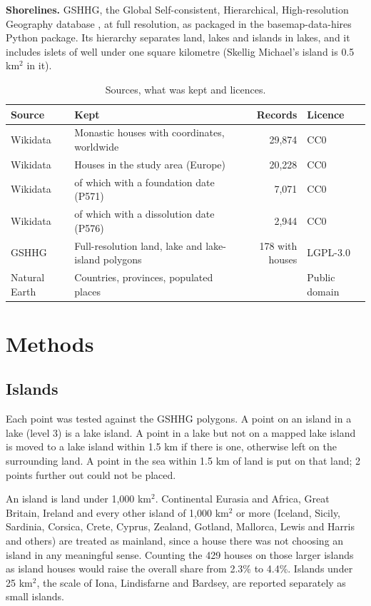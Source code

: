 \documentclass[11pt,a4paper]{article}
\begin{document}
\textbf{Shorelines.} GSHHG, the Global Self-consistent, Hierarchical, High-resolution Geography database \citep{gshhg}, at full resolution, as packaged in the basemap-data-hires Python package. Its hierarchy separates land, lakes and islands in lakes, and it includes islets of well under one square kilometre (Skellig Michael's island is 0.5 km$^2$ in it).

\begin{table}[tbp]\centering\small\caption{Sources, what was kept and licences.}\label{tab:sources}\begin{tabular}{>{\raggedright\arraybackslash}p{3.0cm}>{\raggedright\arraybackslash}p{7.4cm}r>{\raggedright\arraybackslash}p{2.0cm}}\toprule Source & Kept & Records & Licence\\\midrule
Wikidata & Monastic houses with coordinates, worldwide & 29,874 & CC0\\
Wikidata & Houses in the study area (Europe) & 20,228 & CC0\\
Wikidata & of which with a foundation date (P571) & 7,071 & CC0\\
Wikidata & of which with a dissolution date (P576) & 2,944 & CC0\\
GSHHG & Full-resolution land, lake and lake-island polygons & 178 with houses & LGPL-3.0\\
Natural Earth & Countries, provinces, populated places & & Public domain\\
\bottomrule\end{tabular}\end{table}

\section{Methods}
\subsection{Islands}
Each point was tested against the GSHHG polygons. A point on an island in a lake (level 3) is a lake island. A point in a lake but not on a mapped lake island is moved to a lake island within 1.5 km if there is one, otherwise left on the surrounding land. A point in the sea within 1.5 km of land is put on that land; 2 points further out could not be placed.

An island is land under 1,000 km$^2$. Continental Eurasia and Africa, Great Britain, Ireland and every other island of 1,000 km$^2$ or more (Iceland, Sicily, Sardinia, Corsica, Crete, Cyprus, Zealand, Gotland, Mallorca, Lewis and Harris and others) are treated as mainland, since a house there was not choosing an island in any meaningful sense. Counting the 429 houses on those larger islands as island houses would raise the overall share from 2.3\% to 4.4\%. Islands under 25 km$^2$, the scale of Iona, Lindisfarne and Bardsey, are reported separately as small islands.
\end{document}
